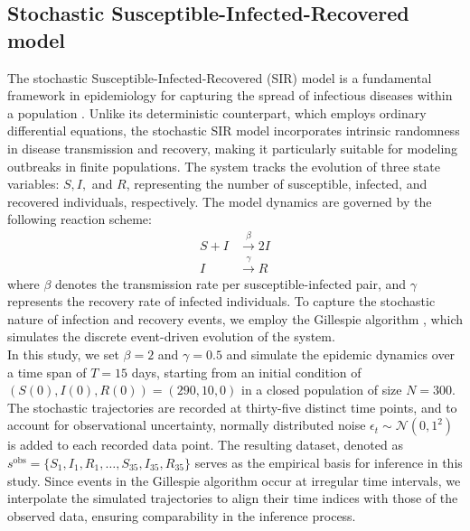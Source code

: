 \documentclass[12pt]{article} %
\begin{document}
\subsection*{Stochastic Susceptible-Infected-Recovered model}
The stochastic Susceptible-Infected-Recovered (SIR) model is a fundamental framework in epidemiology for capturing the spread of infectious diseases within a population \cite{dd}. Unlike its deterministic counterpart, which employs ordinary differential equations, the stochastic SIR model incorporates intrinsic randomness in disease transmission and recovery, making it particularly suitable for modeling outbreaks in finite populations. The system tracks the evolution of three state variables: $S, I,$ and $R$, representing the number of susceptible, infected, and recovered individuals, respectively. The model dynamics are governed by the following reaction scheme:  
\begin{align*}
S + I &\xrightarrow{\beta} 2I\\
 I &\xrightarrow{\gamma} R
\end{align*}
where $\beta$ denotes the transmission rate per susceptible-infected pair, and $\gamma$ represents the recovery rate of infected individuals. To capture the stochastic nature of infection and recovery events, we employ the Gillespie algorithm \citep{gillespie1977exact}, which simulates the discrete event-driven evolution of the system.\\
In this study, we set $\beta = 2 $ and $ \gamma = 0.5 $ and simulate the epidemic dynamics over a time span of $T = 15$ days, starting from an initial condition of $ (S(0), I(0), R(0)) = (290, 10, 0) $ in a closed population of size $N = 300$. The stochastic trajectories are recorded at thirty-five distinct time points, and to account for observational uncertainty, normally distributed noise $ \epsilon_t \sim \mathcal{N}(0, 1^2) $ is added to each recorded data point. The resulting dataset, denoted as
$s^{\mathrm{obs}} = \{ S_1, I_1, R_1, \dots, S_{35}, I_{35}, R_{35} \} $  
serves as the empirical basis for inference in this study. Since events in the Gillespie algorithm occur at irregular time intervals, we interpolate the simulated trajectories to align their time indices with those of the observed data, ensuring comparability in the inference process.

\end{document}
